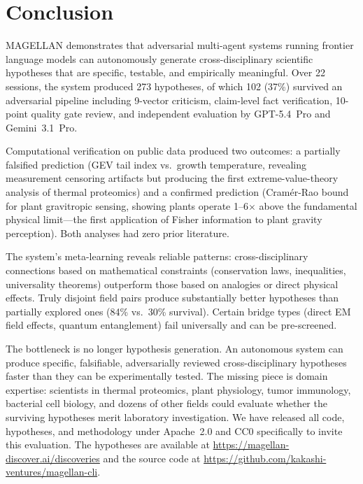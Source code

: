 \section{Conclusion}
\label{sec:conclusion}

MAGELLAN demonstrates that adversarial multi-agent systems running frontier language models can autonomously generate cross-disciplinary scientific hypotheses that are specific, testable, and empirically meaningful. Over 22 sessions, the system produced 273 hypotheses, of which 102 (37\%) survived an adversarial pipeline including 9-vector criticism, claim-level fact verification, 10-point quality gate review, and independent evaluation by GPT-5.4~Pro and Gemini~3.1~Pro.

Computational verification on public data produced two outcomes: a partially falsified prediction (GEV tail index vs.\ growth temperature, revealing measurement censoring artifacts but producing the first extreme-value-theory analysis of thermal proteomics) and a confirmed prediction (Cram\'{e}r-Rao bound for plant gravitropic sensing, showing plants operate 1--6$\times$ above the fundamental physical limit---the first application of Fisher information to plant gravity perception). Both analyses had zero prior literature.

The system's meta-learning reveals reliable patterns: cross-disciplinary connections based on mathematical constraints (conservation laws, inequalities, universality theorems) outperform those based on analogies or direct physical effects. Truly disjoint field pairs produce substantially better hypotheses than partially explored ones (84\% vs.\ 30\% survival). Certain bridge types (direct EM field effects, quantum entanglement) fail universally and can be pre-screened.

The bottleneck is no longer hypothesis generation. An autonomous system can produce specific, falsifiable, adversarially reviewed cross-disciplinary hypotheses faster than they can be experimentally tested. The missing piece is domain expertise: scientists in thermal proteomics, plant physiology, tumor immunology, bacterial cell biology, and dozens of other fields could evaluate whether the surviving hypotheses merit laboratory investigation. We have released all code, hypotheses, and methodology under Apache~2.0 and CC0 specifically to invite this evaluation. The hypotheses are available at \url{https://magellan-discover.ai/discoveries} and the source code at \url{https://github.com/kakashi-ventures/magellan-cli}.

